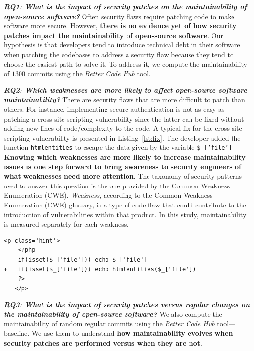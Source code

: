 \documentclass[smallextended]{svjour3}       %
\newcounter{lstannotation}
\begin{document}
\textit{\textbf{RQ1: What is the impact of security patches on the
maintainability of open-source software?}} Often security flaws 
require patching code to make software more secure. However, 
\textbf{there is no evidence yet of how security patches impact the
maintainability of open-source software}. Our hypothesis is that 
developers tend to introduce technical debt in their software when 
patching the codebases to address a security flaw because they tend 
to choose the easiest path to solve it. To address it, we compute 
the maintainability of $1300$ commits using the \emph{Better Code Hub} tool. 

\textit{\textbf{RQ2: Which weaknesses are more likely to
affect open-source software maintainability?}} There are security 
flaws that are more difficult to patch than others. For instance, 
implementing secure authentication is not as easy as patching a
cross-site scripting vulnerability since the latter can be fixed
without adding new lines of code/complexity to the code. A typical 
fix for the cross-site scripting vulnerability is presented in 
Listing~\ref{lst:fix}. The developer added the function 
\texttt{htmlentities} to escape the data given by the variable
\texttt{\$\_['file']}. \textbf{Knowing which weaknesses are more 
likely to increase maintainability issues is one step forward to 
bring awareness to security engineers of what weaknesses need more 
attention}. The taxonomy of security patterns used to answer this 
question is the one provided by the Common Weakness Enumeration
(CWE). \emph{Weakness}, according to the Common Weakness Enumeration 
(CWE) glossary, is a type of code-flaw that could contribute to the 
introduction of vulnerabilities within that product. In this study, maintainability 
is measured separately for each weakness.
%
\setcounter{lstannotation}{0}
\begin{lstlisting}[style={PHPStyle}, caption={Fix provided by \texttt{nextcloud/server} developers to a Cross-Site Scripting vulnerability},label={lst:fix}]
   <p class='hint'>
    <?php
-   if(isset($_['file'])) echo $_['file']
+   if(isset($_['file'])) echo htmlentities($_['file'])
    ?>
   </p>
\end{lstlisting}
%
\textit{\textbf{RQ3: What is the impact of security patches versus 
regular changes on the maintainability of open-source software?}}
%
We also compute the maintainability of random regular commits using 
the \emph{Better Code Hub} tool---baseline. We use them to 
understand \textbf{how maintainability evolves when security patches 
are performed versus when they are not}.
%
\end{document}
